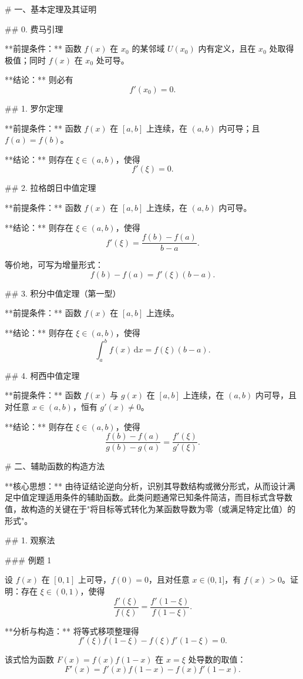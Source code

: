 # 一、基本定理及其证明

## 0. 费马引理

**前提条件：** 函数 $f(x)$ 在 $x_0$ 的某邻域 $U(x_0)$ 内有定义，且在 $x_0$ 处取得极值；同时 $f(x)$ 在 $x_0$ 处可导。

**结论：** 则必有
$$
f'(x_0) = 0.
$$

## 1. 罗尔定理

**前提条件：** 函数 $f(x)$ 在 $[a,b]$ 上连续，在 $(a,b)$ 内可导；且 $f(a) = f(b)$。

**结论：** 则存在 $\xi \in (a,b)$，使得
$$
f'(\xi) = 0.
$$

## 2. 拉格朗日中值定理

**前提条件：** 函数 $f(x)$ 在 $[a,b]$ 上连续，在 $(a,b)$ 内可导。

**结论：** 则存在 $\xi \in (a,b)$，使得
$$
f'(\xi) = \frac{f(b) - f(a)}{b - a}.
$$

等价地，可写为增量形式：
$$
f(b) - f(a) = f'(\xi)(b - a).
$$

## 3. 积分中值定理（第一型）

**前提条件：** 函数 $f(x)$ 在 $[a,b]$ 上连续。

**结论：** 则存在 $\xi \in (a,b)$，使得
$$
\int_a^b f(x)\,\mathrm{d}x = f(\xi)(b - a).
$$

## 4. 柯西中值定理

**前提条件：** 函数 $f(x)$ 与 $g(x)$ 在 $[a,b]$ 上连续，在 $(a,b)$ 内可导，且对任意 $x \in (a,b)$，恒有 $g'(x) \neq 0$。

**结论：** 则存在 $\xi \in (a,b)$，使得
$$
\frac{f(b) - f(a)}{g(b) - g(a)} = \frac{f'(\xi)}{g'(\xi)}.
$$

# 二、辅助函数的构造方法

**核心思想：** 由待证结论逆向分析，识别其导数结构或微分形式，从而设计满足中值定理适用条件的辅助函数。此类问题通常已知条件简洁，而目标式含导数值，故构造的关键在于"将目标等式转化为某函数导数为零（或满足特定比值）的形式"。

## 1. 观察法

### 例题 1

设 $f(x)$ 在 $[0,1]$ 上可导，$f(0) = 0$，且对任意 $x \in (0,1]$，有 $f(x) > 0$。证明：存在 $\xi \in (0,1)$，使得
$$
\frac{f'(\xi)}{f(\xi)} = \frac{f'(1 - \xi)}{f(1 - \xi)}.
$$

**分析与构造：** 将等式移项整理得
$$
f'(\xi)f(1 - \xi) - f(\xi)f'(1 - \xi) = 0.
$$

该式恰为函数 $F(x) = f(x)f(1 - x)$ 在 $x = \xi$ 处导数的取值：
$$
F'(x) = f'(x)f(1 - x) - f(x)f'(1 - x).
$$


